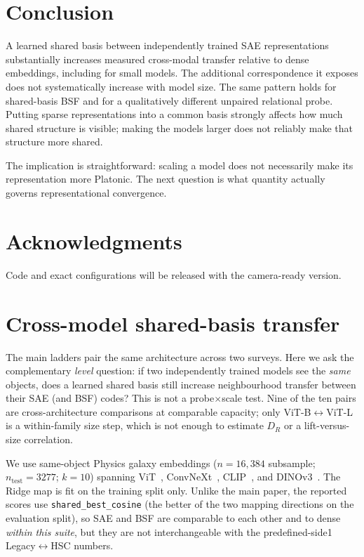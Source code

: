\documentclass{article}
\begin{document}
\section{Conclusion}
\label{sec:conc}

A learned shared basis between independently trained SAE representations substantially increases measured cross-modal transfer relative to dense embeddings, including for small models.
The additional correspondence it exposes does not systematically increase with model size.
The same pattern holds for shared-basis BSF and for a qualitatively different unpaired relational probe.
Putting sparse representations into a common basis strongly affects how much shared structure is visible; making the models larger does not reliably make that structure more shared.

The implication is straightforward: scaling a model does not necessarily make its representation more Platonic.
The next question is what quantity actually governs representational convergence.

\section*{Acknowledgments}
Code and exact configurations will be released with the camera-ready version.




\appendix
\section{Cross-model shared-basis transfer}
\label{app:cross-model}

The main ladders pair the same architecture across two surveys.
Here we ask the complementary \emph{level} question: if two independently trained models see the \emph{same} objects, does a learned shared basis still increase neighbourhood transfer between their SAE (and BSF) codes?
This is not a probe\(\times\)scale test.
Nine of the ten pairs are cross-architecture comparisons at comparable capacity; only ViT-B\(\leftrightarrow\)ViT-L is a within-family size step, which is not enough to estimate \(D_R\) or a lift-versus-size correlation.

We use same-object Physics galaxy embeddings (\(n{=}16{,}384\) subsample; \(n_{\mathrm{test}}{=}3277\); \(k{=}10\)) spanning ViT~\citep{dosovitskiy2021vit}, ConvNeXt~\citep{woo2023convnextv2}, CLIP~\citep{radford2021clip}, and DINOv3~\citep{simeoni2025dinov3}.
The Ridge map is fit on the training split only.
Unlike the main paper, the reported scores use \texttt{shared\_best\_cosine} (the better of the two mapping directions on the evaluation split), so SAE and BSF are comparable to each other and to dense \emph{within this suite}, but they are not interchangeable with the predefined-side1 Legacy\(\leftrightarrow\)HSC numbers.
\end{document}
